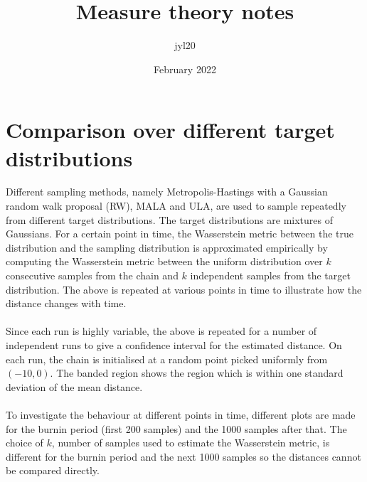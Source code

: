\documentclass{article}
\title{Measure theory notes}
\author{jyl20 }
\date{February 2022}
\theoremstyle{definition}
\newcommand{\1}{\mathbbm{1}}
\begin{document}
\section{Comparison over different target distributions}
Different sampling methods, namely Metropolis-Hastings with a Gaussian random walk proposal (RW), MALA and ULA, are used to sample repeatedly from different target distributions. The target distributions are mixtures of Gaussians. For a certain point in time, the Wasserstein metric between the true distribution and the sampling distribution is approximated empirically by computing the Wasserstein metric between the uniform distribution over $k$ consecutive samples from the chain and $k$ independent samples from the target distribution. The above is repeated at various points in time to illustrate how the distance changes with time.
\\\\
Since each run is highly variable, the above is repeated for a number of independent runs to give a confidence interval for the estimated distance. On each run, the chain is initialised at a random point picked uniformly from $(-10, 0)$. The banded region shows the region which is within one standard deviation of the mean distance.
\\\\
To investigate the behaviour at different points in time, different plots are made for the burnin period (first 200 samples) and the 1000 samples after that. The choice of $k$, number of samples used to estimate the Wasserstein metric, is different for the burnin period and the next 1000 samples so the distances cannot be compared directly.
\end{document}
